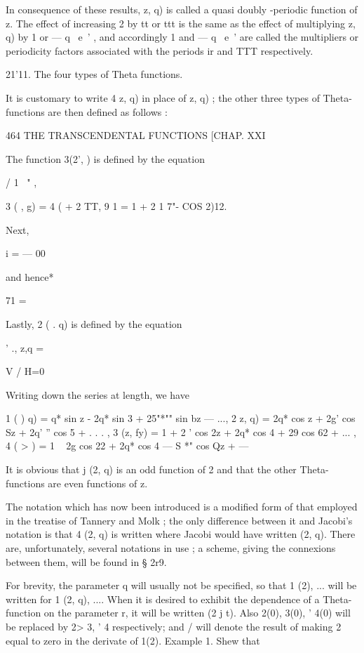 In consequence of these results, z, q) is called a quasi doubly
-periodic function of z. The effect of increasing 2 by tt or ttt is
the same as the effect of multiplying z, q) by 1 or — q~ e~' , and
accordingly 1 and — q~ e~' are called the multipliers or periodicity
factors associated with the periods ir and TTT respectively.

21'11. The four types of Theta functions.

It is customary to write 4 z, q) in place of z, q) ; the other three
types of Theta-functions are then defined as follows :

464 THE TRANSCENDENTAL FUNCTIONS [CHAP. XXI

The function 3(2', ) is defined by the equation

/ 1 \ " ,

 3 ( , g) = 4 ( + 2 TT, 9 1 = 1 + 2 1 7"- COS 2)12.

Next, %

 i = — 00

and hence* %

71 =

Lastly, 2 ( . q) is defined by the equation

' ., z,q = %

V / H=0

Writing down the series at length, we have

 1 ( ) q) = q* sin z - 2q* sin 3 + 25"*"" sin bz — ..., 2 z, q) = 2q*
cos z + 2g' cos Sz + 2q' '' cos 5 + . . . , 3 (z, fy) = 1 + 2 ' cos 2z
+ 2q* cos 4 + 29 cos 62 + ... , 4 ( > ) = 1 ~ 2g cos 22 + 2q* cos 4 —
S *" cos Qz + —

It is obvious that j (2, q) is an odd function of 2 and that the other
Theta-functions are even functions of z.

The notation which has now been introduced is a modified form of that
employed in the treatise of Tannery and Molk ; the only difference
between it and Jacobi's notation is that 4 (2, q) is written where
Jacobi would have written (2, q). There are, unfortunately, several
notations in use ; a scheme, giving the connexions between them, will
be found in § 2r9.

For brevity, the parameter q will usually not be specified, so that 1
(2), ... will be written for 1 (2, q), .... When it is desired to
exhibit the dependence of a Theta-function on the parameter r, it will
be written (2 j t). Also 2(0), 3(0), ' 4(0) will be replaced by 2> 3,
' 4 respectively; and / will denote the result of making 2 equal to
zero in the derivate of 1(2). Example 1. Shew that

